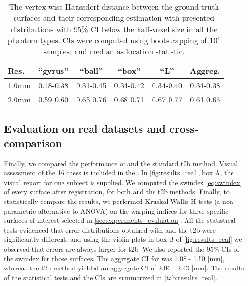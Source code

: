 \begin{table}
		\centering
		\footnotesize
    \tabcolsep=0.1cm
    \begin{tabular}{lccccc}
    Res.   & ``gyrus'' & ``ball''  & ``box''   & ``L''     & Aggreg.    \\\hline
    1.0mm  & 0.18-0.38 & 0.31-0.45 & 0.34-0.42 & 0.34-0.40 & 0.34-0.38  \\
    2.0mm  & 0.59-0.60 & 0.65-0.76 & 0.68-0.71 & 0.67-0.77 & 0.64-0.66  \\
    \hline
    \end{tabular}
    \caption{The vertex-wise Haussdorf distance between the ground-truth surfaces and their
    corresponding estimation with \regseg{} presented distributions with 95\% CI below
    the half-voxel size in all the phantom types.
    CIs were computed using bootstrapping of 10$^4$ samples, and median as location statistic.}\label{tab:ci_phantom}
\end{table}

\subsection{Evaluation on real datasets and cross-comparison}\label{sec:results_hcp}
%
Finally, we compared the performance of \regseg{} and the standard \gls*{t2b}
  method.
Visual assessment of the 16 cases is included in the .
In \autoref{fig:results_real}, box A, the visual report for one subject is supplied.
We computed the \gls*{swindex} \eqref{eq:swindex} of every surface after registration,
  for both \regseg{} and the \gls*{t2b} methods.
Finally, to statistically compare the results, we performed Kruskal-Wallis H-tests
  (a non-parametric alternative to ANOVA) on the warping indices for three specific 
  surfaces of interest selected in \autoref{sec:experiments_evaluation}.
All the statistical tests evidenced that error distributions obtained with \regseg{} and
  the \gls*{t2b} were significantly different, and using the violin plots in box B of
  \autoref{fig:results_real} we observed that errors are always larger for \gls*{t2b}.
We also reported the 95\% CIs of the \gls*{swindex} for those surfaces.
The aggregate CI for \regseg{} was 1.08 - 1.50 [mm], whereas the \gls*{t2b} method
  yielded an aggregate CI of 2.06 - 2.43 [mm].
The results of the statistical tests and the CIs are summarized in \autoref{tab:results_real}.



